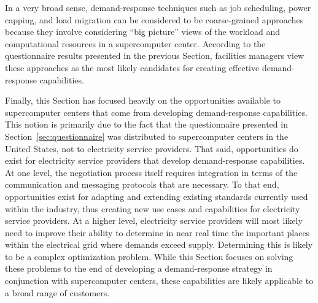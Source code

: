 In a very broad sense, demand-response techniques such as job
scheduling, power capping, and load migration can be considered to
be coarse-grained approaches because they involve considering ``big
picture'' views of the workload and computational resources in a
supercomputer center.  According to the questionnaire results
presented in the previous Section, facilities managers view these
approaches as the most likely candidates for creating effective
demand-response capabilities.

Finally, this Section has focused heavily on the opportunities
available to supercomputer centers that come from developing
demand-response capabilities.  This notion is primarily due to the
fact that the questionnaire presented in Section~\ref{sec:questionnaire}
was distributed to supercomputer centers in the United States, not to
electricity service providers.  That said, opportunities do exist for
electricity service providers that develop demand-response
capabilities.  At one level, the negotiation process itself requires
integration in terms of the communication and messaging protocols that
are necessary.  To that end, opportunities exist for adapting and
extending existing standards currently used within the industry, thus
creating new use cases and capabilities for electricity service
providers.  At a higher level, electricity service providers will most
likely need to improve their ability to determine in near real time
the important places within the electrical grid where demands exceed
supply.  Determining this is likely to be a complex optimization
problem.  While this Section focuses on solving these problems to the
end of developing a demand-response strategy in conjunction with
supercomputer centers, these capabilities are likely applicable to a
broad range of customers.

